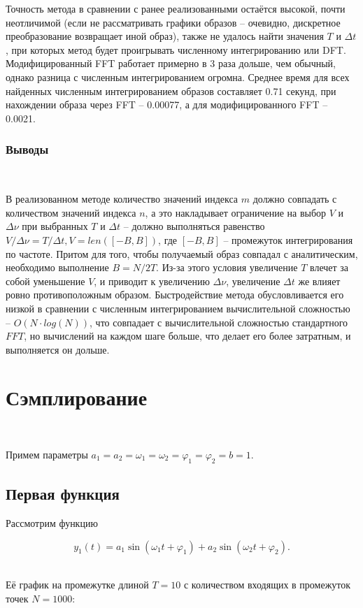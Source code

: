 \documentclass[a4paper]{article}
\begin{document}
Точность метода в сравнении с ранее реализованными остаётся высокой, почти неотличимой (если не рассматривать графики образов -- очевидно, дискретное преобразование возвращает иной образ), также не удалось найти значения $T$ и $\Delta t$, при которых метод будет проигрывать численному интегрированию или DFT.
Модифицированный FFT работает примерно в 3 раза дольше, чем обычный, однако разница с численным интегрированием огромна. Среднее время для всех найденных численным интегрированием образов составляет 0.71 секунд, при нахождении образа через FFT -- 0.00077, а для модифицированного FFT -- 0.0021.

\subsubsection{Выводы}\

В реализованном методе количество значений индекса $m$ должно совпадать с количеством значений индекса $n$, а это накладывает ограничение на выбор $V$ и $\Delta \nu$ при выбранных $T$ и $\Delta t$ -- должно выполняться равенство $V / \Delta \nu = T/\Delta t, V = len([-B, B])$, где $[-B, B]$ -- промежуток интегрирования по частоте. Притом для того, чтобы получаемый образ совпадал с аналитическим, необходимо выполнение $B = N/2T$. Из-за этого условия увеличение $T$ влечет за собой уменьшение $V$, и приводит к увеличению $\Delta \nu$, увеличение $\Delta t$ же влияет ровно противоположным образом. Быстродействие метода обусловливается его низкой в сравнении с численным интегрированием вычислительной сложностью -- $O(N \cdot log(N))$, что совпадает с вычислительной сложностью стандартного $FFT$, но вычислений на каждом шаге больше, что делает его более затратным, и выполняется он дольше.

\section{Сэмплирование}\

Примем параметры $a_1 = a_2 = \omega_1 = \omega_2 = \varphi_1 = \varphi_2 = b = 1$.


\subsection{Первая функция}

Рассмотрим функцию

$$
y_1(t) = a_1\sin{(\omega_1t + \varphi_1)} + a_2\sin{(\omega_2t+\varphi_2)}.
$$\ 

Её график на промежутке длиной $T = 10$ с количеством входящих в промежуток точек $N = 1000$:
\end{document}
